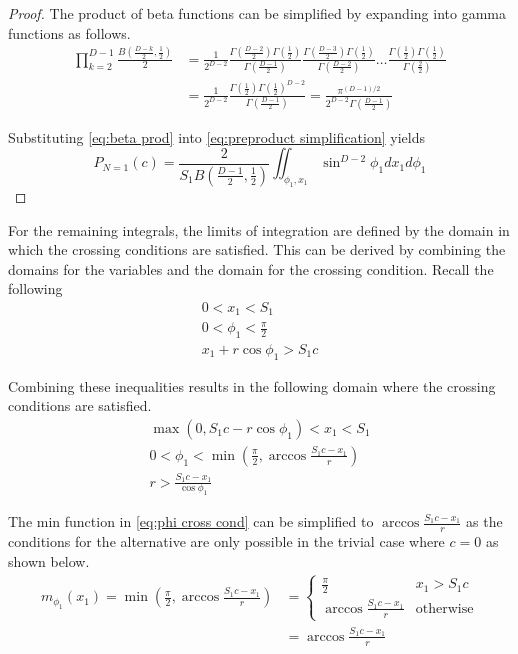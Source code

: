 \documentclass{article}
\begin{document}
\begin{proof}
	The product of beta functions can be simplified by expanding into gamma functions as follows.
	\begin{align}
		\prod_{k=2}^{D-1}\frac{B(\frac{D-k}{2}, \frac{1}{2})}{2} &= \frac{1}{2^{D-2}} \frac{\Gamma(\frac{D-2}{2})\Gamma(\frac{1}{2})}{\Gamma(\frac{D-1}{2})} \frac{\Gamma(\frac{D-3}{2})\Gamma(\frac{1}{2})}{\Gamma(\frac{D-2}{2})} \hdots \frac{\Gamma(\frac{1}{2})\Gamma(\frac{1}{2})}{\Gamma(\frac{2}{2})} \\
		&= \frac{1}{2^{D-2}} \frac{\Gamma(\frac{1}{2})\Gamma(\frac{1}{2})^{D-2}}{\Gamma(\frac{D-1}{2})} = \frac{\pi^{(D-1)/2}}{2^{D-2}\Gamma(\frac{D-1}{2})} \label{eq:beta prod}
	\end{align}

	Substituting \ref{eq:beta prod} into \ref{eq:preproduct simplification} yields
	\begin{equation}
		P_{N=1}(c) = \frac{2}{S_1B(\frac{D-1}{2}, \frac{1}{2})} \iint_{\phi_1,x_1}\sin^{D-2}\phi_1 dx_1 d\phi_1 \label{eq:n=1 int}
	\end{equation}
\end{proof}

For the remaining integrals, the limits of integration are defined by the domain in which the crossing conditions are satisfied. This
can be derived by combining the domains for the variables and the domain for the crossing condition. Recall the following
\begin{gather*}
	0 < x_1 < S_1 \\
	0 < \phi_1 < \frac{\pi}{2} \\
	x_1 + r\cos\phi_1 > S_1c
\end{gather*}

Combining these inequalities results in the following domain where the crossing conditions are satisfied.
\begin{gather}
	\max(0, S_1c-r\cos\phi_1) < x_1 < S_1 \label{eq:x cross cond} \\
	0 < \phi_1 < \min(\frac{\pi}{2}, \arccos\frac{S_1c-x_1}{r}) \label{eq:phi cross cond} \\
	r > \frac{S_1c - x_1}{\cos{\phi_1}} \label{eq:r cross cond}
\end{gather}

The min function in \ref{eq:phi cross cond} can be simplified to $\arccos\frac{S_1c-x_1}{r}$ as the conditions for the alternative are
only possible in the trivial case where $c=0$ as shown below.
\begin{align}
	m_{\phi_1}(x_1) = \min(\frac{\pi}{2}, \arccos\frac{S_1c-x_1}{r}) &= \begin{cases}
		\frac{\pi}{2} & x_1>S_1c \\
		\arccos\frac{S_1c-x_1}{r} & \text{otherwise}
	\end{cases} \\
	&= \arccos\frac{S_1c-x_1}{r} 
\end{align}
\end{document}
